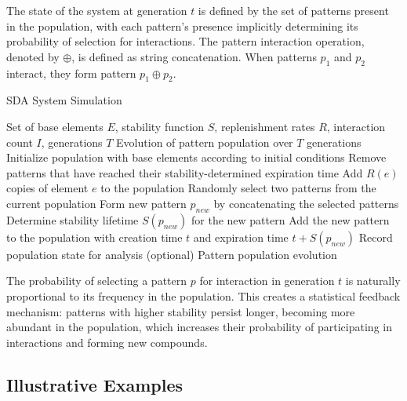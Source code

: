 \documentclass[preprint,12pt]{elsarticle}
\begin{document}
The state of the system at generation $t$ is defined by the set of patterns present in the population, with each pattern's presence implicitly determining its probability of selection for interactions. The pattern interaction operation, denoted by $\oplus$, is defined as string concatenation. When patterns $p_1$ and $p_2$ interact, they form pattern $p_1 \oplus p_2$.


\begin{algorithm}[H]
\caption{SDA System Simulation}
\begin{algorithmic}[1]
\REQUIRE Set of base elements $E$, stability function $S$, replenishment rates $R$, interaction count $I$, generations $T$
\ENSURE Evolution of pattern population over $T$ generations
\STATE Initialize population with base elements according to initial conditions
   \STATE Remove patterns that have reached their stability-determined expiration time
       \STATE Add $R(e)$ copies of element $e$ to the population
   \ENDFOR
       \STATE Randomly select two patterns from the current population
       \STATE Form new pattern $p_{new}$ by concatenating the selected patterns
       \STATE Determine stability lifetime $S(p_{new})$ for the new pattern
       \STATE Add the new pattern to the population with creation time $t$ and expiration time $t + S(p_{new})$
   \ENDFOR
   \STATE Record population state for analysis (optional)
\ENDFOR
\RETURN Pattern population evolution
\end{algorithmic}
\end{algorithm}


The probability of selecting a pattern $p$ for interaction in generation $t$ is naturally proportional to its frequency in the population. This creates a statistical feedback mechanism: patterns with higher stability persist longer, becoming more abundant in the population, which increases their probability of participating in interactions and forming new compounds.

\subsection{Illustrative Examples}
\end{document}
